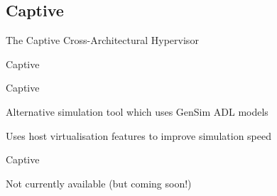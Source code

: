 \subsection{Captive}

\begin{frame}{The Captive Cross-Architectural Hypervisor}

\end{frame}

\begin{frame}{Captive}

\end{frame}

\begin{frame}{Captive}

Alternative simulation tool which uses GenSim ADL models

Uses host virtualisation features to improve simulation speed

\end{frame}

\begin{frame}{Captive}
	
	Not currently available (but coming soon!)
	
\end{frame}
